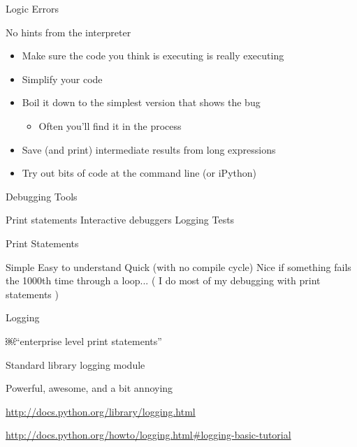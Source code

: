 \documentclass{beamer}
\begin{document}
\begin{frame}[fragile]{Logic Errors}

{\LARGE No hints from the interpreter}

\vfill
\begin{itemize}
  \item Make sure the code you think is executing is really executing
  \item Simplify your code
  \item Boil it down to the simplest version that shows the bug
  \begin{itemize}
    \item Often you'll find it in the process
  \end{itemize}
  \item Save (and print) intermediate results from long expressions
  \item Try out bits of code at the command line (or iPython)
\end{itemize}

\end{frame} 

\begin{frame}[fragile]{Debugging Tools}

{\LARGE
\vfill
Print statements
\vfill
Interactive debuggers
\vfill
Logging
\vfill
Tests
}
\end{frame} 

\begin{frame}[fragile]{Print Statements}

{\LARGE
\vfill
Simple
\vfill
Easy to understand
\vfill
Quick (with no compile cycle)
\vfill
Nice if something fails the 1000th time through a loop...
}
\vfill
( I do most of my debugging with print statements )
\end{frame} 

\begin{frame}[fragile]{Logging}

{\LARGE ￼``enterprise level print statements''}

\vfill
Standard library logging module

\vfill
Powerful, awesome, and a bit annoying

\vfill
\url{http://docs.python.org/library/logging.html}

\vspace{0.25in}
\url{http://docs.python.org/howto/logging.html#logging-basic-tutorial}

\end{frame} 
\end{document}
